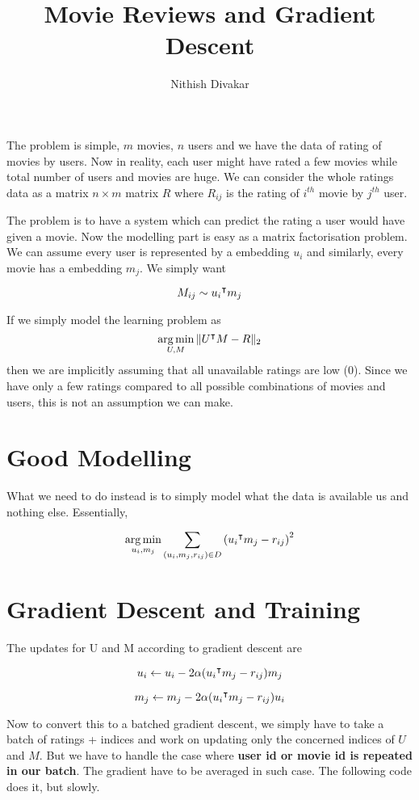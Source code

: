 \documentclass[12pt,crop=false,class=article,convert={density=300,outext=.compiled.png}]{standalone}
\title{\Huge Movie Reviews and Gradient Descent 
}
\date{}
\author{Nithish Divakar}
\begin{document}
\maketitle


The problem is simple, $m$ movies, $n$ users and we have the data of rating of movies by users. Now in reality, each user might have rated a few movies while total number of users and movies are huge. We can consider the whole ratings data as a matrix $n\times m $ matrix $R$ where $R_{ij}$  is the rating of $i^{th}$ movie by $j^{th}$ user.


The problem is to have a system which can predict the rating a user would have given a movie. Now the modelling part is easy as a matrix factorisation problem. We can assume every user is represented by a embedding $u_i$  and similarly, every movie has a embedding $m_j$. We simply want 

$$M_{ij}  \sim { u_i}^\intercal m_j$$


If we simply model the learning problem as $$ \operatorname*{arg\,min}_{U,M} \| {U}^\intercal M - R \|_2$$ then we are implicitly assuming that all unavailable ratings are low (0). Since we have only a few ratings compared to all possible combinations of movies and users, this is not an assumption we can make. 

\section*{Good Modelling}

What we need to do instead is to simply model what the data is available us and nothing else.  Essentially, 

$$\operatorname*{arg\,min}_{u_i,m_j}  \sum_{(u_i,m_j,r_{ij})\in D} \left({u_i}^\intercal m_j - r_{ij}\right)^2$$


\section*{Gradient Descent and Training}

The updates for U and M according to gradient descent are

$$u_i \gets u_i -  2\alpha ({u_i}^\intercal m_j  - r_{ij})m_j$$

$$m_j \gets m_j - 2\alpha ({u_i}^\intercal m_j  - r_{ij})u_i$$


Now to convert this to a batched gradient descent, we simply have to take a batch of ratings + indices and work on updating only the concerned indices of $U$ and $M$. But we have to handle the case where \textbf{user id or movie id is repeated in our batch}. The gradient have to be averaged in such case. The following code does it, but slowly. 
\end{document}
